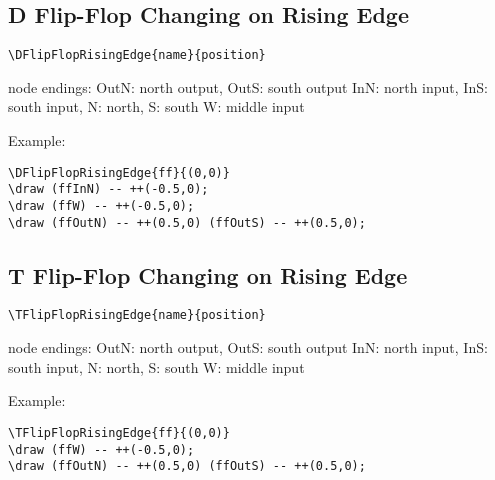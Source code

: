 \documentclass[parskip=full]{scrartcl}
\begin{document}
\subsection{D Flip-Flop Changing on Rising Edge}

\begin{verbatim}
\DFlipFlopRisingEdge{name}{position}
\end{verbatim}
node endings: OutN: north output, OutS: south output
              InN: north input, InS: south input,
              N: north, S: south
              W: middle input

Example:\\
\begin{minipage}{0.8\textwidth}
\begin{verbatim}
\DFlipFlopRisingEdge{ff}{(0,0)}
\draw (ffInN) -- ++(-0.5,0);
\draw (ffW) -- ++(-0.5,0);
\draw (ffOutN) -- ++(0.5,0) (ffOutS) -- ++(0.5,0);
\end{verbatim}
\end{minipage}
\begin{minipage}{0.19\textwidth}
\end{minipage}

\subsection{T Flip-Flop Changing on Rising Edge}

\begin{verbatim}
\TFlipFlopRisingEdge{name}{position}
\end{verbatim}
node endings: OutN: north output, OutS: south output
              InN: north input, InS: south input,
              N: north, S: south
              W: middle input

Example:\\
\begin{minipage}{0.8\textwidth}
\begin{verbatim}
\TFlipFlopRisingEdge{ff}{(0,0)}
\draw (ffW) -- ++(-0.5,0);
\draw (ffOutN) -- ++(0.5,0) (ffOutS) -- ++(0.5,0);
\end{verbatim}
\end{minipage}
\begin{minipage}{0.19\textwidth}
\end{minipage}
\end{document}
